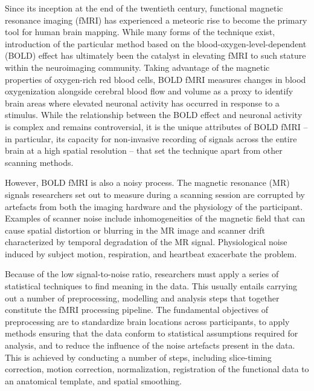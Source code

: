 Since its inception at the end of the twentieth century, functional magnetic resonance imaging (fMRI) has experienced a meteoric rise to become the primary tool for human brain mapping. While many forms of the technique exist, introduction of the particular method based on the blood-oxygen-level-dependent (BOLD) effect has ultimately been the catalyst in elevating fMRI to such stature within the neuroimaging community. Taking advantage of the magnetic properties of oxygen-rich red blood cells, BOLD fMRI measures changes in blood oxygenization alongside cerebral blood flow and volume as a proxy to identify brain areas where elevated neuronal activity has occurred in response to a stimulus. While the relationship between the BOLD effect and neuronal activity is complex and remains controversial, it is the unique attributes of BOLD fMRI -- in particular, its capacity for non-invasive recording of signals across the entire brain at a high spatial resolution -- that set the technique apart from other scanning methods.

However, BOLD fMRI is also a noisy process. The magnetic resonance (MR) signals researchers set out to measure during a scanning session are corrupted by artefacts from both the imaging hardware and the physiology of the participant. Examples of scanner noise include inhomogeneities of the magnetic field that can cause spatial distortion or blurring in the MR image and scanner drift characterized by temporal degradation of the MR signal. Physiological noise induced by subject motion, respiration, and heartbeat exacerbate the problem. 

Because of the low signal-to-noise ratio, researchers must apply a series of statistical techniques to find meaning in the data. This usually entails carrying out a number of preprocessing, modelling and analysis steps that together constitute the fMRI processing pipeline. The fundamental objectives of preprocessing are to standardize brain locations across participants, to apply methods ensuring that the data conform to statistical assumptions required for analysis, and to reduce the influence of the noise artefacts present in the data. This is achieved by conducting a number of steps, including slice-timing correction, motion correction, normalization, registration of the functional data to an anatomical template, and spatial smoothing. 

